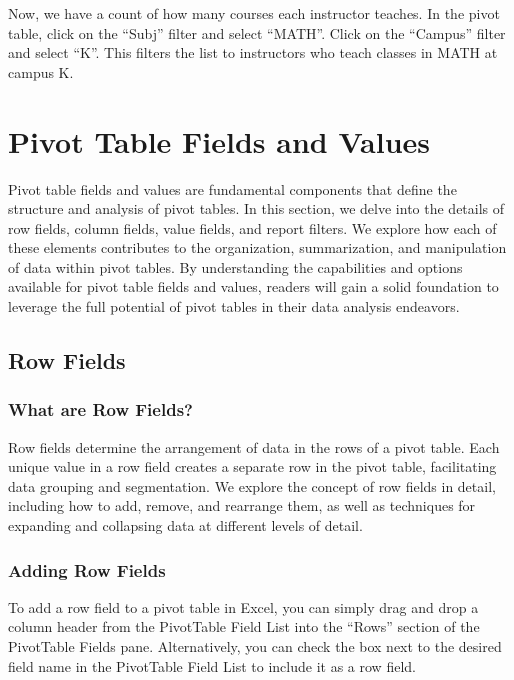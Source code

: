 \documentclass[
]{book}
\begin{document}
Now, we have a count of how many courses each instructor teaches. In the pivot table, click on the ``Subj'' filter and select ``MATH''. Click on the ``Campus'' filter and select ``K''. This filters the list to instructors who teach classes in MATH at campus K.

\hypertarget{pivot-table-fields-and-values}{%
\chapter{Pivot Table Fields and Values}\label{pivot-table-fields-and-values}}

Pivot table fields and values are fundamental components that define the structure and analysis of pivot tables. In this section, we delve into the details of row fields, column fields, value fields, and report filters. We explore how each of these elements contributes to the organization, summarization, and manipulation of data within pivot tables. By understanding the capabilities and options available for pivot table fields and values, readers will gain a solid foundation to leverage the full potential of pivot tables in their data analysis endeavors.

\hypertarget{row-fields}{%
\section{Row Fields}\label{row-fields}}

\hypertarget{what-are-row-fields}{%
\subsection{What are Row Fields?}\label{what-are-row-fields}}

Row fields determine the arrangement of data in the rows of a pivot table. Each unique value in a row field creates a separate row in the pivot table, facilitating data grouping and segmentation. We explore the concept of row fields in detail, including how to add, remove, and rearrange them, as well as techniques for expanding and collapsing data at different levels of detail.

\hypertarget{adding-row-fields}{%
\subsection{Adding Row Fields}\label{adding-row-fields}}

To add a row field to a pivot table in Excel, you can simply drag and drop a column header from the PivotTable Field List into the ``Rows'' section of the PivotTable Fields pane. Alternatively, you can check the box next to the desired field name in the PivotTable Field List to include it as a row field.
\end{document}

